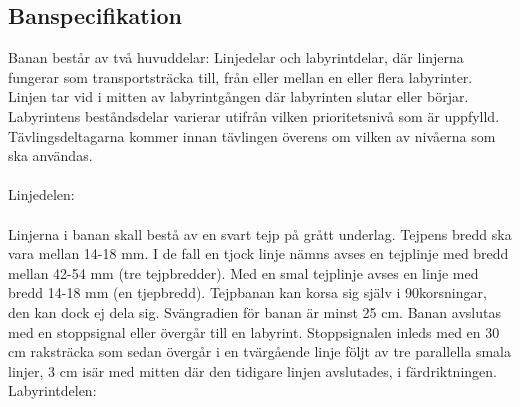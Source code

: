 \documentclass[a4paper,12pt]{article}
\begin{document}


\subsection{Banspecifikation} \label{app:bana}


Banan består av två huvuddelar: Linjedelar och labyrintdelar, där linjerna fungerar som transportsträcka till, från eller mellan en eller flera labyrinter. Linjen tar vid i mitten av labyrintgången där labyrinten slutar eller börjar. Labyrintens beståndsdelar varierar utifrån vilken prioritetsnivå som är uppfylld. Tävlingsdeltagarna kommer innan tävlingen överens om vilken av nivåerna som ska användas.
\\
\\
Linjedelen:
\\
\\
Linjerna i banan skall bestå av en svart tejp på grått underlag. Tejpens bredd ska vara mellan 14-18 mm. I de fall en tjock linje nämns avses en tejplinje med bredd mellan 42-54 mm (tre tejpbredder). Med en smal tejplinje avses en linje med bredd 14-18 mm (en tjepbredd). Tejpbanan kan korsa sig själv i 90\degree korsningar, den kan dock ej dela sig. Svängradien för banan är minst 25 cm. Banan avslutas med en stoppsignal eller övergår till en labyrint. Stoppsignalen inleds med en 30 cm raksträcka som sedan övergår i en tvärgående linje följt av tre parallella smala linjer, 3 cm isär med mitten där den tidigare linjen avslutades, i färdriktningen.
\\


Labyrintdelen:
\end{document}
